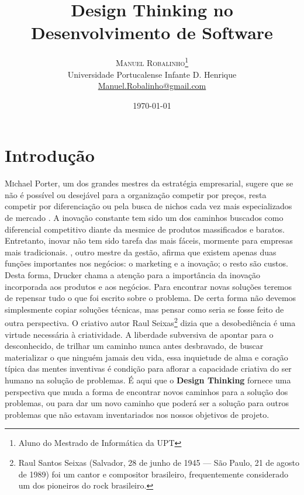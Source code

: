 \documentclass[twoside,twocolumn]{article}
\title{Design Thinking no Desenvolvimento de Software} %
\author{%
\textsc{Manuel Robalinho}\thanks{Aluno do Mestrado de Informática da UPT} \\[1ex] %
\normalsize Universidade Portucalense Infante D. Henrique \\ %
\normalsize \href{mailto:manuel.robalinho@gmail.com}{Manuel.Robalinho@gmail.com} %
}
\date{\today} %
\begin{document}
\maketitle


\section{Introdução}

\lettrine[nindent=0em,lines=3]{M} 
ichael Porter, um dos grandes mestres da estratégia empresarial, sugere que se não é possível ou desejável para a organização competir por preços, resta competir por diferenciação ou pela busca de nichos cada vez mais especializados de mercado \citep{Porter1990}. 
\newline \indent A inovação constante tem sido um dos caminhos buscados como diferencial competitivo diante da mesmice de produtos massificados e baratos. Entretanto, inovar não tem sido tarefa das mais fáceis, mormente para empresas mais tradicionais. \citep{Drucker1954}, outro mestre da gestão, afirma que existem apenas duas funções importantes nos negócios: o marketing e a inovação; o resto são custos. Desta forma, Drucker chama a atenção para a importância da inovação incorporada aos produtos e aos negócios.
\newline \indent Para encontrar novas soluções teremos de repensar tudo o que foi escrito sobre o problema. De certa forma não devemos simplesmente copiar soluções técnicas, mas pensar como seria se fosse feito de outra perspectiva.
\citep{Vagner2017} O criativo autor Raul Seixas\footnote{Raul Santos Seixas (Salvador, 28 de junho de 1945 — São Paulo, 21 de agosto de 1989) foi um cantor e compositor brasileiro, frequentemente considerado um dos pioneiros do rock brasileiro.} dizia que a desobediência é uma virtude necessária à criatividade. A liberdade subversiva de apontar para o desconhecido, de trilhar um caminho nunca antes desbravado, de buscar materializar o que ninguém jamais deu vida, essa inquietude de alma e coração típica das mentes inventivas é condição para aflorar a capacidade criativa do ser humano na solução de problemas. É aqui que o \textbf{Design Thinking} fornece uma perspectiva que muda a forma de encontrar novos caminhos para a solução dos problemas, ou para dar um novo caminho que poderá ser a solução para outros problemas que não estavam inventariados nos nossos objetivos de projeto.
\end{document}
